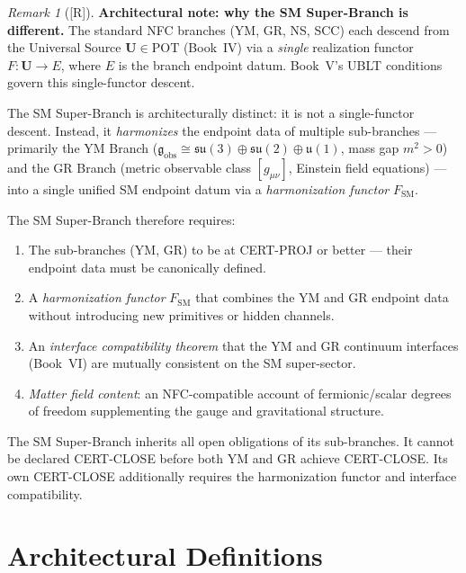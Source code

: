 \documentclass[12pt,oneside]{amsbook}
\theoremstyle{plain}
\theoremstyle{definition}
\theoremstyle{remark}
\newtheorem{remark}[theorem]{Remark}
\newcommand{\status}[1]{\textup{[#1]}}
\begin{document}
\begin{remark}[\status{R}]
\textbf{Architectural note: why the SM Super-Branch is different.}
The standard NFC branches (YM, GR, NS, SCC) each descend from the
Universal Source $\mathbf{U} \in \mathrm{POT}$ (Book~IV) via a
\emph{single} realization functor $F : \mathbf{U} \to E$, where $E$
is the branch endpoint datum. Book~V's UBLT conditions govern this
single-functor descent.

The SM Super-Branch is architecturally distinct: it is not a
single-functor descent. Instead, it \emph{harmonizes} the endpoint
data of multiple sub-branches --- primarily the YM Branch
($\mathfrak{g}_{\mathrm{obs}} \cong
\mathfrak{su}(3)\oplus\mathfrak{su}(2)\oplus\mathfrak{u}(1)$, mass
gap $m^2 > 0$) and the GR Branch (metric observable class
$[g_{\mu\nu}]$, Einstein field equations) --- into a single unified
SM endpoint datum via a \emph{harmonization functor}
$F_{\mathrm{SM}}$.

The SM Super-Branch therefore requires:
\begin{enumerate}[label=\textup{(\arabic*)}]
 \item The sub-branches (YM, GR) to be at CERT-PROJ or better ---
 their endpoint data must be canonically defined.
 \item A \emph{harmonization functor} $F_{\mathrm{SM}}$ that
 combines the YM and GR endpoint data without introducing new
 primitives or hidden channels.
 \item An \emph{interface compatibility theorem} that the YM and
 GR continuum interfaces (Book~VI) are mutually consistent on
 the SM super-sector.
 \item \emph{Matter field content}: an NFC-compatible account of
 fermionic/scalar degrees of freedom supplementing the gauge
 and gravitational structure.
\end{enumerate}
The SM Super-Branch inherits all open obligations of its
sub-branches. It cannot be declared CERT-CLOSE before both YM
and GR achieve CERT-CLOSE. Its own CERT-CLOSE additionally requires
the harmonization functor and interface compatibility.
\end{remark}

\section{Architectural Definitions}
\label{sec:sm-architecture}
\end{document}
